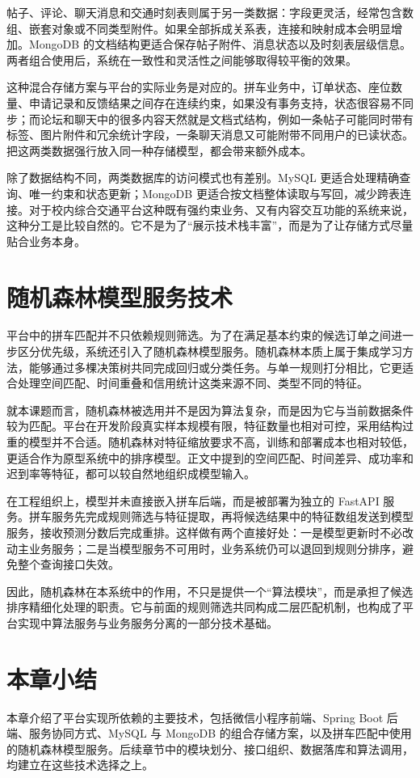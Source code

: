 帖子、评论、聊天消息和交通时刻表则属于另一类数据：字段更灵活，经常包含数组、嵌套对象或不同类型附件。如果全部拆成关系表，连接和映射成本会明显增加。MongoDB 的文档结构更适合保存帖子附件、消息状态以及时刻表层级信息\cite{sadalage2015}。两者组合使用后，系统在一致性和灵活性之间能够取得较平衡的效果。

这种混合存储方案与平台的实际业务是对应的。拼车业务中，订单状态、座位数量、申请记录和反馈结果之间存在连续约束，如果没有事务支持，状态很容易不同步；而论坛和聊天中的很多内容天然就是文档式结构，例如一条帖子可能同时带有标签、图片附件和冗余统计字段，一条聊天消息又可能附带不同用户的已读状态。把这两类数据强行放入同一种存储模型，都会带来额外成本。

除了数据结构不同，两类数据库的访问模式也有差别。MySQL 更适合处理精确查询、唯一约束和状态更新；MongoDB 更适合按文档整体读取与写回，减少跨表连接。对于校内综合交通平台这种既有强约束业务、又有内容交互功能的系统来说，这种分工是比较自然的。它不是为了“展示技术栈丰富”，而是为了让存储方式尽量贴合业务本身。

\section{随机森林模型服务技术}

平台中的拼车匹配并不只依赖规则筛选。为了在满足基本约束的候选订单之间进一步区分优先级，系统还引入了随机森林模型服务。随机森林本质上属于集成学习方法，能够通过多棵决策树共同完成回归或分类任务。与单一规则打分相比，它更适合处理空间匹配、时间重叠和信用统计这类来源不同、类型不同的特征。

就本课题而言，随机森林被选用并不是因为算法复杂，而是因为它与当前数据条件较为匹配。平台在开发阶段真实样本规模有限，特征数量也相对可控，采用结构过重的模型并不合适。随机森林对特征缩放要求不高，训练和部署成本也相对较低，更适合作为原型系统中的排序模型。正文中提到的空间匹配、时间差异、成功率和迟到率等特征，都可以较自然地组织成模型输入。

在工程组织上，模型并未直接嵌入拼车后端，而是被部署为独立的 FastAPI 服务。拼车服务先完成规则筛选与特征提取，再将候选结果中的特征数组发送到模型服务，接收预测分数后完成重排。这样做有两个直接好处：一是模型更新时不必改动主业务服务；二是当模型服务不可用时，业务系统仍可以退回到规则分排序，避免整个查询接口失效。

因此，随机森林在本系统中的作用，不只是提供一个“算法模块”，而是承担了候选排序精细化处理的职责。它与前面的规则筛选共同构成二层匹配机制，也构成了平台实现中算法服务与业务服务分离的一部分技术基础。

\section{本章小结}

本章介绍了平台实现所依赖的主要技术，包括微信小程序前端、Spring Boot 后端、服务协同方式、MySQL 与 MongoDB 的组合存储方案，以及拼车匹配中使用的随机森林模型服务。后续章节中的模块划分、接口组织、数据落库和算法调用，均建立在这些技术选择之上。

